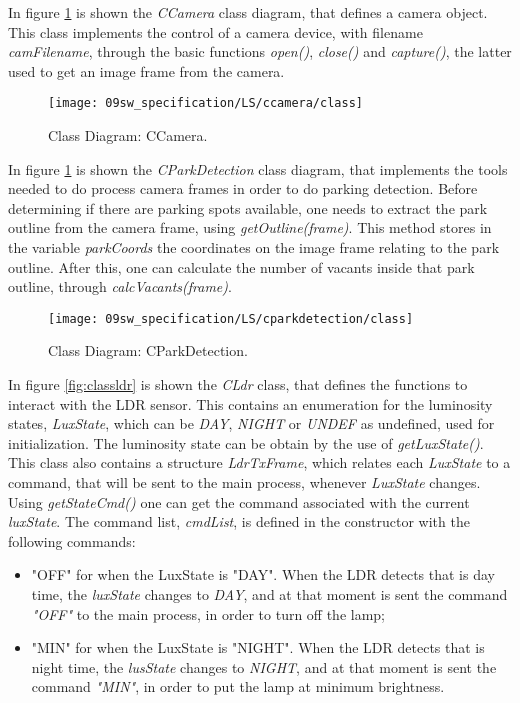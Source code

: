 
In figure \ref{fig:classcamera} is shown the \textit{CCamera} class diagram, that defines a camera object.  This class implements the control of a camera device, with filename \textit{camFilename}, through the basic functions \textit{open()}, \textit{close()} and \textit{capture()}, the latter used to get an image frame from the camera.

\begin{figure}[H]
	\centering
	\texttt{[image: 09sw\_specification/LS/ccamera/class]}
	\caption{Class Diagram: CCamera.}
	\label{fig:classcamera}
\end{figure}

\clearpage
{}

In figure \ref{fig:classcamera} is shown the \textit{CParkDetection} class diagram, that implements the tools needed to do process camera frames in order to do parking detection. Before determining if there are parking spots available, one needs to extract the park outline from the camera frame, using \textit{getOutline(frame)}. This method stores in the variable \textit{parkCoords} the coordinates on the image frame relating to the park outline. After this, one can calculate the number of vacants inside that park outline, through \textit{calcVacants(frame)}.

\begin{figure}[H]
	\centering
	\texttt{[image: 09sw\_specification/LS/cparkdetection/class]}
	\caption{Class Diagram: CParkDetection.}
	\label{fig:classparkdetection}
\end{figure}

\clearpage
{}

In figure \ref{fig:classldr} is shown the \textit{CLdr} class, that defines the functions to interact with the LDR sensor. This contains an enumeration for the luminosity states, \textit{LuxState}, which can be \textit{DAY}, \textit{NIGHT} or \textit{UNDEF} as undefined, used for initialization. The luminosity state can be obtain by the use of \textit{getLuxState()}. This class also contains a structure \textit{LdrTxFrame}, which relates each \textit{LuxState} to a command, that will be sent to the main process, whenever \textit{LuxState} changes. Using \textit{getStateCmd()} one can get the command associated with the current \textit{luxState}. The command list, \textit{cmdList}, is defined in the constructor with the following commands:
\begin{itemize}
	\item "OFF" for when the LuxState is "DAY". When the LDR detects that is day time, the \textit{luxState} changes to \textit{DAY}, and at that moment is sent the command \textit{"OFF"} to the main process, in order to turn off the lamp;
	\item "MIN" for when the LuxState is "NIGHT". When the LDR detects that is night time, the \textit{lusState} changes to \textit{NIGHT}, and at that moment is sent the command \textit{"MIN"}, in order to put the lamp at minimum brightness.
\end{itemize}

